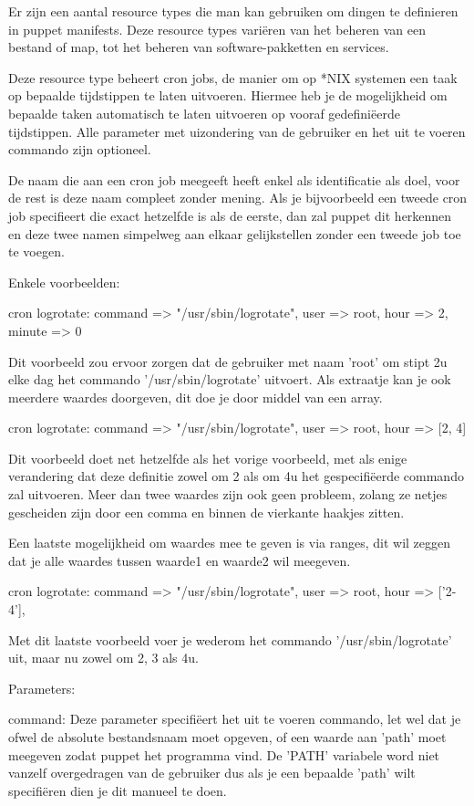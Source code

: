 Er zijn een aantal resource types die man kan gebruiken om dingen te definieren in puppet manifests.
Deze resource types variëren van het beheren van een bestand of map, tot het beheren van software-pakketten en services.



	Deze resource type beheert cron jobs, de manier om op *NIX systemen een taak op bepaalde tijdstippen te laten uitvoeren.
	Hiermee heb je de mogelijkheid om bepaalde taken automatisch te laten uitvoeren op vooraf gedefiniëerde tijdstippen.
	Alle parameter met uizondering van de gebruiker en het uit te voeren commando zijn optioneel.

	De naam die aan een cron job meegeeft heeft enkel als identificatie als doel, voor de rest is deze naam compleet zonder mening.
	Als je bijvoorbeeld een tweede cron job specifieert die exact hetzelfde is als de eerste, dan zal puppet dit herkennen en deze twee namen simpelweg aan elkaar gelijkstellen zonder een tweede job toe te voegen.

	Enkele voorbeelden:

	cron { logrotate:
		command => "/usr/sbin/logrotate",
		user => root,
		hour => 2,
		minute => 0
	}

	Dit voorbeeld zou ervoor zorgen dat de gebruiker met naam 'root' om stipt 2u elke dag het commando '/usr/sbin/logrotate' uitvoert.
	Als extraatje kan je ook meerdere waardes doorgeven, dit doe je door middel van een array.

	cron { logrotate:
		command => "/usr/sbin/logrotate",
		user => root,
		hour => [2, 4]
	}

	Dit voorbeeld doet net hetzelfde als het vorige voorbeeld, met als enige verandering dat deze definitie zowel om 2 als om 4u het gespecifiëerde commando zal uitvoeren.
	Meer dan twee waardes zijn ook geen probleem, zolang ze netjes gescheiden zijn door een comma en binnen de vierkante haakjes zitten.

	Een laatste mogelijkheid om waardes mee te geven is via ranges, dit wil zeggen dat je alle waardes tussen waarde1 en waarde2 wil meegeven.

	cron { logrotate:
		command => "/usr/sbin/logrotate",
		user => root,
		hour => ['2-4'],
	}

	Met dit laatste voorbeeld voer je wederom het commando '/usr/sbin/logrotate' uit, maar nu zowel om 2, 3 als 4u.


	Parameters:

		command:
		Deze parameter specifiëert het uit te voeren commando, let wel dat je ofwel de absolute bestandsnaam moet opgeven, of een waarde aan 'path' moet meegeven zodat puppet het programma vind.
		De 'PATH' variabele word niet vanzelf overgedragen van de gebruiker dus als je een bepaalde 'path' wilt specifiëren dien je dit manueel te doen.


